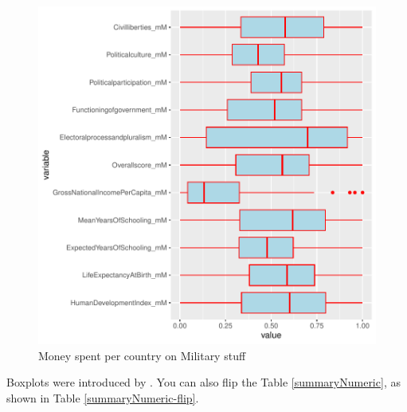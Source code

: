 \documentclass[a4paper, 12pt]{article}
\begin{document}
\begin{figure}[h]
\centering
\begin{adjustbox}{width=12cm,height=8.5cm,clip,trim=0cm 0.5cm 0cm 0cm} 
\includegraphics{WorkInR_forPrinter-numBoxplot}
\end{adjustbox}
\caption{Money spent per country on Military stuff}  
\label{numBoxplot} 
\end{figure}

Boxplots were introduced by \citet{tukey_exploratory_1977}. You can also flip the Table \ref{summaryNumeric}, as shown in Table \ref{summaryNumeric-flip}.
\end{document}
